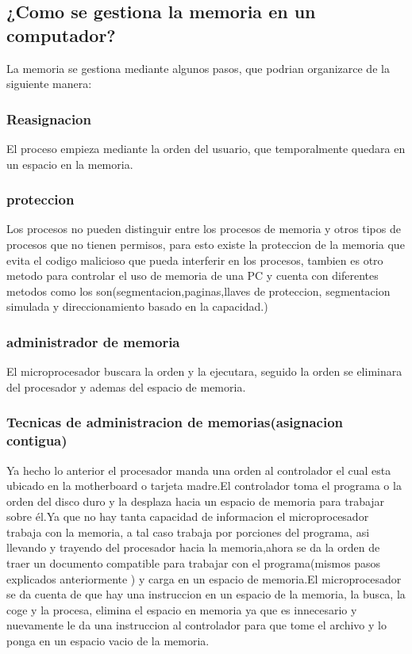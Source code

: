 \documentclass{article}
\begin{document}
    \subsection{¿Como se gestiona la memoria en un computador?}
    La memoria se gestiona mediante algunos pasos, que podrian organizarce de la siguiente manera:
    
        \subsubsection{Reasignacion} El proceso empieza mediante la orden del usuario, que temporalmente quedara en un espacio en la memoria.\cite{wikipedia}
        
        \subsubsection{proteccion} Los procesos no pueden distinguir entre los procesos de memoria y otros tipos de procesos que no tienen permisos, para esto existe la proteccion de la memoria que evita el codigo malicioso que pueda interferir en los procesos, tambien es otro metodo para controlar el uso de memoria de una PC  y cuenta con diferentes metodos como los son(segmentacion,paginas,llaves de proteccion, segmentacion simulada y direccionamiento basado en la capacidad.)\cite{wiki}
        
    
        \subsubsection{administrador de memoria}El microprocesador buscara la orden y la ejecutara, seguido la orden se eliminara del procesador y ademas del espacio de memoria.
    
        \subsubsection{Tecnicas de administracion de memorias(asignacion contigua)}   Ya hecho lo anterior el procesador manda una orden al controlador el cual esta ubicado en la motherboard o tarjeta madre.El controlador toma el programa o la orden del disco duro y la desplaza hacia un espacio de memoria para trabajar sobre él.Ya que no hay tanta capacidad de informacion el microprocesador trabaja con la memoria, a tal caso trabaja por porciones del programa, asi llevando y trayendo del procesador hacia la memoria,ahora se da la orden de traer un documento compatible para trabajar con el programa(mismos pasos explicados anteriormente )  y carga en un espacio de memoria.El microprocesador se da cuenta de que hay una instruccion en un espacio de la memoria, la busca, la coge y la procesa, elimina el espacio en memoria ya que es innecesario y nuevamente le da una instruccion al controlador para que tome el archivo y lo ponga en un espacio vacio de la memoria.\cite{profe}
        
\end{document}

